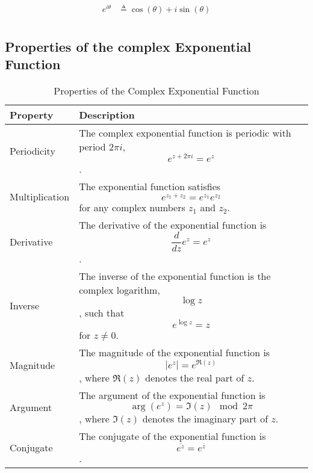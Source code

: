 \begin{remark}
    \begin{align}
        e^{i\theta} & \triangleq \cos(\theta) + i \sin(\theta) \\
    \end{align}
\end{remark}

\subsection*{Properties of the complex Exponential Function}
\begin{table}[htbp]
    \centering
    \begin{tabular}{| m{2.5cm} | m{11.5cm} |}
        \hline
        \textbf{Property} & \textbf{Description}                                                                                                                      \\
        \hline
        Periodicity       & The complex exponential function is periodic with period \( 2\pi i \), \[ e^{z + 2\pi i} = e^z \].                                        \\
        \hline
        Multiplication    & The exponential function satisfies \[ e^{z_1 + z_2} = e^{z_1} e^{z_2} \] for any complex numbers \( z_1 \) and \( z_2 \).                 \\
        \hline
        Derivative        & The derivative of the exponential function is \[ \frac{d}{dz} e^z = e^z \].                                                               \\
        \hline
        Inverse           & The inverse of the exponential function is the complex logarithm, \[ \log z \], such that \[ e^{\log z} = z \] for \( z \neq 0 \).        \\
        \hline
        Magnitude         & The magnitude of the exponential function is \[ |e^z| = e^{\Re(z)} \], where \( \Re(z) \) denotes the real part of \( z \).               \\
        \hline
        Argument          & The argument of the exponential function is \[ \arg(e^z) = \Im(z) \mod 2\pi \], where \( \Im(z) \) denotes the imaginary part of \( z \). \\
        \hline
        Conjugate         & The conjugate of the exponential function is \[ \overline{e^z} = e^{\overline{z}} \].                                                     \\
        \hline
    \end{tabular}
    \caption{Properties of the Complex Exponential Function}
    \label{table:complex_exponential_properties}
\end{table}


